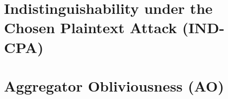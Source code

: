 \documentclass[twocolumn]{autart}    %
\begin{document}

\appendix
\section{Indistinguishability under the Chosen Plaintext Attack (IND-CPA)} \label{app:ind-cpa}
\section{Aggregator Obliviousness (AO)} \label{app:ao}
\end{document}
